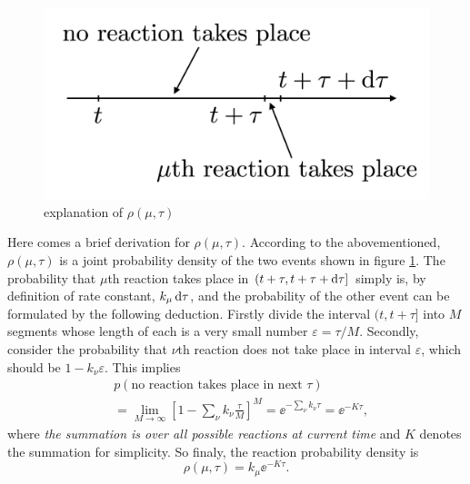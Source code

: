 		\begin{figure}
		\centering
		\includegraphics[scale=0.24]{img/reaction_prob.png}
		\caption{explanation of $\rho(\mu,\tau)$ }
		\label{img:reaction_prob}
		\end{figure}

		Here comes a brief derivation for $\rho(\mu,\tau)$. According to the abovementioned, $\rho(\mu,\tau)$ is a joint probability density of the two events shown in figure \ref{img:reaction_prob}. The probability that $\mu$th reaction takes place in $(t+\tau, t+\tau + \operatorname{d\!} \tau]$ simply is, by definition of rate constant, $k_\mu \operatorname{d\!} \tau$, and the probability of the other event can be formulated by the following deduction. Firstly divide the interval $(t,t+\tau]$ into $M$ segments whose length of each is a very small number $\varepsilon=\tau / M$. Secondly, consider the probability that $\nu$th reaction does not take place in interval $\varepsilon$, which should be $1-k_\nu\varepsilon$. This implies
		\begin{equation}
			\begin{aligned}
			&p(\text{no reaction takes place in next $\tau$}) \\&=
				\lim_{M\to\infty} \left[ 1-\sum_{\nu}k_\nu\frac{\tau}{M} \right]^{M} 
				=\ee^{-\sum_\nu k_\nu \tau} = \ee^{-K\tau},
			\end{aligned}
			\label{eq:possion}
		\end{equation}
		where \textit{the summation is over all possible reactions at current time} and $K$ denotes the summation for simplicity. So finaly, the reaction probability density is
		\begin{equation}
			\rho(\mu,\tau) = k_\mu \ee^{-K\tau}.
		\end{equation}

